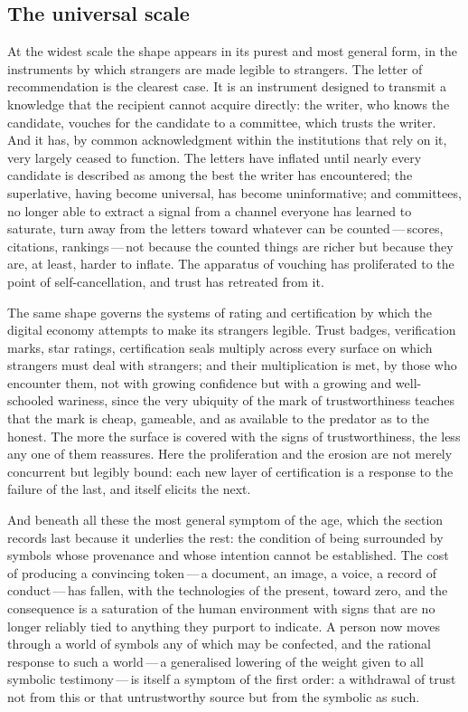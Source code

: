 \subsection{The universal scale}
\label{p13:sub:sympt-universal}

At the widest scale the shape appears in its purest and most general form, in the instruments by which strangers are made legible to strangers. The letter of recommendation is the clearest case. It is an instrument designed to transmit a knowledge that the recipient cannot acquire directly: the writer, who knows the candidate, vouches for the candidate to a committee, which trusts the writer. And it has, by common acknowledgment within the institutions that rely on it, very largely ceased to function. The letters have inflated until nearly every candidate is described as among the best the writer has encountered; the superlative, having become universal, has become uninformative; and committees, no longer able to extract a signal from a channel everyone has learned to saturate, turn away from the letters toward whatever can be counted\,---\,scores, citations, rankings\,---\,not because the counted things are richer but because they are, at least, harder to inflate. The apparatus of vouching has proliferated to the point of self-cancellation, and trust has retreated from it.

The same shape governs the systems of rating and certification by which the digital economy attempts to make its strangers legible. Trust badges, verification marks, star ratings, certification seals multiply across every surface on which strangers must deal with strangers; and their multiplication is met, by those who encounter them, not with growing confidence but with a growing and well-schooled wariness, since the very ubiquity of the mark of trustworthiness teaches that the mark is cheap, gameable, and as available to the predator as to the honest. The more the surface is covered with the signs of trustworthiness, the less any one of them reassures. Here the proliferation and the erosion are not merely concurrent but legibly bound: each new layer of certification is a response to the failure of the last, and itself elicits the next.

And beneath all these the most general symptom of the age, which the section records last because it underlies the rest: the condition of being surrounded by symbols whose provenance and whose intention cannot be established. The cost of producing a convincing token\,---\,a document, an image, a voice, a record of conduct\,---\,has fallen, with the technologies of the present, toward zero, and the consequence is a saturation of the human environment with signs that are no longer reliably tied to anything they purport to indicate. A person now moves through a world of symbols any of which may be confected, and the rational response to such a world\,---\,a generalised lowering of the weight given to all symbolic testimony\,---\,is itself a symptom of the first order: a withdrawal of trust not from this or that untrustworthy source but from the symbolic as such.


